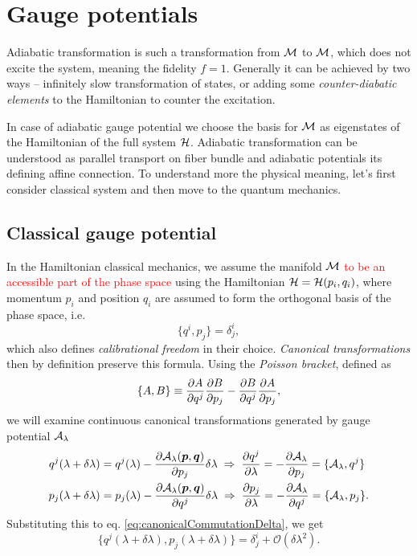 \newpage








\section{Gauge potentials}
Adiabatic transformation is such a transformation from $\mathcal{M}$ to $\mathcal{M}$, which does not excite the system, meaning the fidelity $f=1$. Generally it can be achieved by two ways -- infinitely slow transformation of states, or adding some \emph{counter-diabatic elements} to the Hamiltonian to counter the excitation.


In case of adiabatic gauge potential we choose the basis for $\mathcal{M}$ as eigenstates of the Hamiltonian of the full system $\mathcal{H}$. Adiabatic transformation can be understood as parallel transport on fiber bundle and adiabatic potentials its defining affine connection. To understand more the physical meaning, let's first consider classical system and then move to the quantum mechanics.





\subsection{Classical gauge potential}
In the Hamiltonian classical mechanics, we assume the manifold $\mathcal{M}$ \textcolor{red}{to be an accessible part of the phase space} using the Hamiltonian $\mathcal{H}=\mathcal{H}(p_i,q_i)$, where momentum $p_i$ and position $q_i$ are assumed to form the orthogonal basis of the phase space, i.e.
\begin{equation}
    \{q^i,p_j\}=\delta^i_j,
    \label{eq:canonicalCommutationDelta}
\end{equation}
which also defines \emph{calibrational freedom} in their choice. \emph{Canonical transformations} then by definition preserve this formula. Using the \emph{Poisson bracket}, defined as
\begin{equation}
    \{A,B\}\equiv \frac{\partial A}{\partial q^j}\frac{\partial B}{\partial p_j}-\frac{\partial B}{\partial q^j}\frac{\partial A}{\partial p_j},
\end{equation}
we will examine continuous canonical transformations generated by gauge potential $\mathcal{A}_\lambda$
\begin{align}
        q^j(\lambda+\delta\lambda)&=q^j(\lambda)-\frac{\partial \mathcal{A}_\lambda(\bm{p},\bm{q})}{\partial p_j}\delta\lambda \;\Rightarrow\; \frac{\partial q^j}{\partial \lambda}=-\frac{\partial \mathcal{A}_\lambda}{\partial p_j}=\{\mathcal{A}_\lambda,q^j\}
        \label{eq:gaugeAsGeneratorOfMotion1}\\
        p_j(\lambda+\delta\lambda)&=p_j(\lambda)-\frac{\partial \mathcal{A}_\lambda(\bm{p},\bm{q})}{\partial q^j}\delta\lambda \;\Rightarrow\; \frac{\partial p_j}{\partial \lambda}=-\frac{\partial \mathcal{A}_\lambda}{\partial q^j}=\{\mathcal{A}_\lambda,p_j\}.
        \label{eq:gaugeAsGeneratorOfMotion2}
\end{align}
Substituting this to eq. \ref{eq:canonicalCommutationDelta}, we get
\begin{equation}
    \{q^j(\lambda+\delta\lambda),p_j(\lambda+\delta\lambda)\}=\delta^i_j + \mathcal{O}(\delta\lambda^2).
\end{equation}
 
